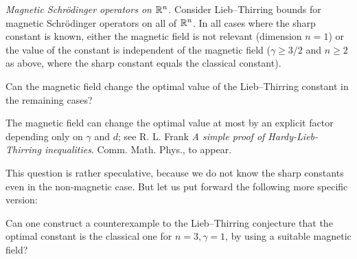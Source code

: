 \documentclass[12pt,letterpaper, reqno]{amsart}
\begin{document}
\begin{problemblock}
 \emph{Magnetic Schr\"{o}dinger
operators on $\mathbb R^n$.} Consider Lieb--Thirring bounds for magnetic
Schr\"{o}dinger operators on all of $\mathbb R^n$. In all cases where the
sharp constant is known, either the magnetic field is not relevant
(dimension $n=1$) or the value of the constant is independent of the
magnetic field ($\gamma\geq 3/2$ and $n\geq 2$ as above, where the
sharp constant equals the classical constant).

\begin{problem}

Can the magnetic field change the optimal value of the
Lieb--Thirring constant in the remaining cases?
\end{problem}

\begin{remark}
 The magnetic field can change the optimal
value at most by an explicit factor depending only on $\gamma$ and
$d$; see R. L. Frank \emph{A simple proof of Hardy-Lieb-Thirring
inequalities}. Comm. Math. Phys., to appear.
\end{remark}

\begin{remark}
This question is rather speculative, because we do not know the
sharp constants even in the non-magnetic case. But let us put
forward the following more specific version:
\end{remark}

\begin{problem}
Can one construct a counterexample to the Lieb--Thirring conjecture
that the optimal constant is the classical one for $n=3, \gamma=1$,
by using a suitable magnetic field?
\end{problem}

\end{problemblock}
\end{document}
